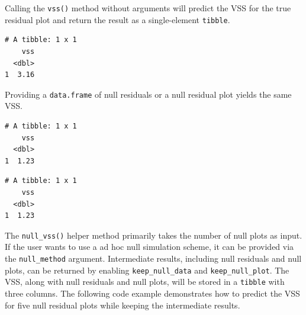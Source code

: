 \documentclass[
doublespace,
  times]{anzsauth}
\newenvironment{Shaded}{\begin{snugshade}}{\end{snugshade}}
\newcommand{\FunctionTok}[1]{\textcolor[rgb]{0.28,0.35,0.67}{#1}}
\newcommand{\NormalTok}[1]{\textcolor[rgb]{0.00,0.23,0.31}{#1}}
\newcommand{\OtherTok}[1]{\textcolor[rgb]{0.00,0.23,0.31}{#1}}
\newcommand{\SpecialCharTok}[1]{\textcolor[rgb]{0.37,0.37,0.37}{#1}}
\begin{document}
Calling the \texttt{vss()} method without arguments will predict the VSS
for the true residual plot and return the result as a single-element
\texttt{tibble}.

\begin{Shaded}
\end{Shaded}

\begin{verbatim}
# A tibble: 1 x 1
    vss
  <dbl>
1  3.16
\end{verbatim}

Providing a \texttt{data.frame} of null residuals or a null residual
plot yields the same VSS.

\begin{Shaded}
\end{Shaded}

\begin{verbatim}
# A tibble: 1 x 1
    vss
  <dbl>
1  1.23
\end{verbatim}

\begin{Shaded}
\end{Shaded}

\begin{verbatim}
# A tibble: 1 x 1
    vss
  <dbl>
1  1.23
\end{verbatim}

The \texttt{null\_vss()} helper method primarily takes the number of
null plots as input. If the user wants to use a ad hoc null simulation
scheme, it can be provided via the \texttt{null\_method} argument.
Intermediate results, including null residuals and null plots, can be
returned by enabling \texttt{keep\_null\_data} and
\texttt{keep\_null\_plot}. The VSS, along with null residuals and null
plots, will be stored in a \texttt{tibble} with three columns. The
following code example demonstrates how to predict the VSS for five null
residual plots while keeping the intermediate results.
\end{document}
